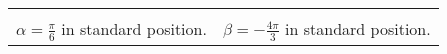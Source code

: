 \documentclass[12pt]{ximera}
\begin{document}
\begin{example}
\begin{enumerate}
\begin{center}

\begin{tabular}{cc}

\scriptsize
\normalsize


&

\hspace{.5in}

\scriptsize
\normalsize
 

\\

$\alpha = \frac{\pi}{6}$ in standard position. & \hspace{1in} $\beta = - \frac{4 \pi}{3}$ in standard position.\\


\end{tabular}
\end{center}
\end{enumerate}
\end{example}
\end{document}
